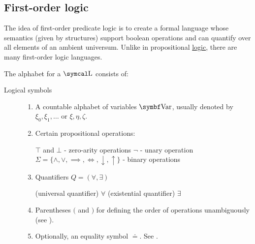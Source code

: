 \subsection{First-order logic}\label{subsec:first_order_logic}

\begin{definition}\label{def:first_order_logic_language}\cite[187]{OpenLogic20201202}
  The idea of first-order predicate logic is to create a formal language whose semantics (given by structures) support boolean operations and can quantify over all elements of an ambient universum. Unlike in propositional \hyperref[subsec:propositional_logic]{logic}, there are many first-order logic languages.

  The alphabet for a  \( \CL \) consists of:
  \begin{description}
    \item[Logical symbols]
    \mbox{}
    \begin{enumerate}
      \item A countable alphabet of variables \( \Bold{Var} \), usually denoted by \( \xi_0, \xi_1, \ldots \) or \( \xi, \eta, \zeta \).

      \item Certain propositional operations:
      \begin{description}
         \( \top \) and \( \bot \) - zero-arity operations
         \( \neg \) - unary operation
         \( \Sigma = \{ \land, \lor, \implies, \iff, \downarrow, \uparrow \} \) - binary operations
      \end{description}

      \item Quantifiers \( Q = ( \forall, \exists ) \)
      \begin{description}
        (universal quantifier) \( \forall \)
        (existential quantifier) \( \exists \)
      \end{description}

      \item Parentheses \( ( \) and \( ) \) for defining the order of operations unambiguously (see ).

      \item Optionally, an equality symbol \( \doteq \). See .
    \end{enumerate}


\end{description}
\end{definition}

